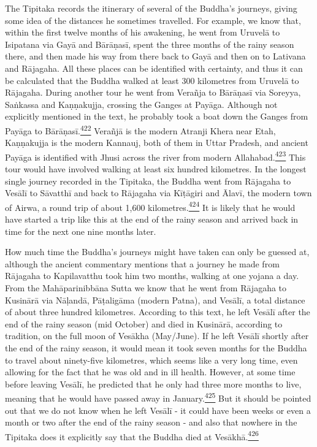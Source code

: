 The Tipitaka records the itinerary of several of the Buddha's journeys,
giving some idea of the distances he sometimes travelled. For example,
we know that, within the first twelve months of his awakening, he went
from Uruvelā to Isipatana via Gayā and Bārāṇasī, spent the three months
of the rainy season there, and then made his way from there back to Gayā
and then on to Lativana and Rājagaha. All these places can be identified
with certainty, and thus it can be calculated that the Buddha walked at
least 300 kilometres from Uruvelā to Rājagaha. During another tour he
went from Verañja to Bārāṇasī via Soreyya, Saṅkassa and Kaṇṇakujja,
crossing the Ganges at Payāga. Although not explicitly mentioned in the
text, he probably took a boat down the Ganges from Payāga to
Bārāṇasī.\label{footprints_split_012.html_fnref422}\hyperref[footprints_split_025.htmlux5cux23fn422]{\textsuperscript{422}}
Verañjā is the modern Atranji Khera near Etah, Kaṇṇakujja is the modern
Kannauj, both of them in Uttar Pradesh, and ancient Payāga is identified
with Jhusi across the river from modern
Allahabad.\label{footprints_split_012.html_fnref423}\hyperref[footprints_split_025.htmlux5cux23fn423]{\textsuperscript{423}}
This tour would have involved walking at least six hundred kilometres.
In the longest single journey recorded in the Tipitaka, the Buddha went
from Rājagaha to Vesālī to Sāvatthī and back to Rājagaha via Kīṭāgiri
and Ālavī, the modern town of Airwa, a round trip of about 1,600
kilometres.\label{footprints_split_012.html_fnref424}\hyperref[footprints_split_025.htmlux5cux23fn424]{\textsuperscript{424}}
It is likely that he would have started a trip like this at the end of
the rainy season and arrived back in time for the next one nine months
later.

How much time the Buddha's journeys might have taken can only be guessed
at, although the ancient commentary mentions that a journey he made from
Rājagaha to Kapilavatthu took him two months, walking at one yojana a
day. From the Mahāparinibbāna Sutta we know that he went from Rājagaha
to Kusinārā via Nāḷandā, Pāṭaligāma (modern Patna), and Vesālī, a total
distance of about three hundred kilometres. According to this text, he
left Vesālī after the end of the rainy season (mid October) and died in
Kusinārā, according to tradition, on the full moon of Vesākha
(May/June). If he left Vesālī shortly after the end of the rainy season,
it would mean it took seven months for the Buddha to travel about
ninety-five kilometres, which seems like a very long time, even allowing
for the fact that he was old and in ill health. However, at some time
before leaving Vesālī, he predicted that he only had three more months
to live, meaning that he would have passed away in
January.\label{footprints_split_012.html_fnref425}\hyperref[footprints_split_025.htmlux5cux23fn425]{\textsuperscript{425}}
But it should be pointed out that we do not know when he left Vesālī -
it could have been weeks or even a month or two after the end of the
rainy season - and also that nowhere in the Tipitaka does it explicitly
say that the Buddha died at
Vesākhā.\label{footprints_split_012.html_fnref426}\hyperref[footprints_split_025.htmlux5cux23fn426]{\textsuperscript{426}}

